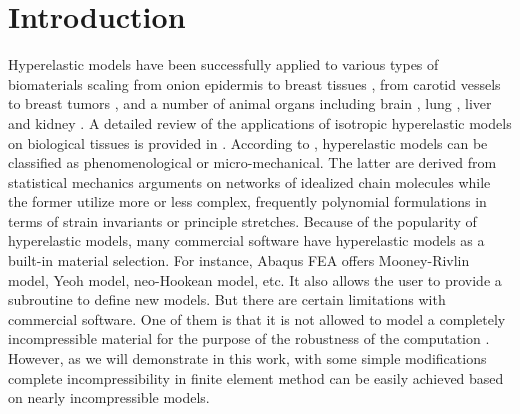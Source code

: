 \section{Introduction}
Hyperelastic models have been successfully applied to various types of biomaterials scaling from onion epidermis \cite{Qian} to breast tissues \cite{OHagen}, from carotid vessels \cite{Zidi, Zidi2, Bols} to breast tumors \cite{Oberai}, and a number of animal organs including brain \cite{Karimi, Samani, Gilchrist}, lung  \cite{Wall, Wall2}, liver and kidney \cite{Fu, Untaroiu, Willinger}. A detailed review of the applications of isotropic hyperelastic models on biological tissues is provided in \cite{Kupriyanova}.
According to \cite{Steinmann}, hyperelastic models can be classified as phenomenological or micro-mechanical. The latter are derived from statistical mechanics arguments on networks of idealized chain molecules while the former utilize more or less complex, frequently polynomial formulations in terms of strain invariants or principle stretches. Because of the popularity of hyperelastic models, many commercial software have hyperelastic models as a built-in material selection. For instance, Abaqus FEA offers Mooney-Rivlin model, Yeoh model, neo-Hookean model, etc. It also allows the user to provide a subroutine to define new models. But there are certain limitations with commercial software. One of them is that it is not allowed to model a completely incompressible material for the purpose of the robustness of the computation \cite{Abaqus}. However, as we will demonstrate in this work, with some simple modifications complete incompressibility in finite element method can be easily achieved based on nearly incompressible models.

